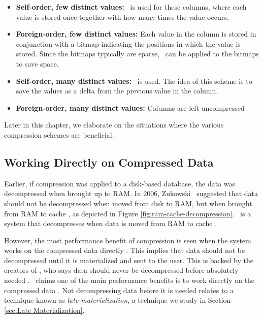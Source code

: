 \begin{itemize}
  \item \textbf{Self-order, few distinct values:} \rle~is used for these columns, where each value is stored once together with how many times the value occurs.
  \item \textbf{Foreign-order, few distinct values:} Each value in the column is stored in conjunction with a bitmap indicating the positions in which the value is stored. Since the bitmaps typically are sparse, \rle~can be applied to the bitmaps to save space.
  \item \textbf{Self-order, many distinct values:} \dele~is used. The idea of this scheme is to save the values as a delta from the previous value in the column.
  \item \textbf{Foreign-order, many distinct values:} Columns are left uncompressed
\end{itemize}

Later in this chapter, we elaborate on the situations where the various compression schemes are beneficial.

\subsection{Working Directly on Compressed Data}
\label{sub:Working Directly on Compressed Data}


Earlier, if compression was applied to a disk-based database, the data was decompressed when brought up to RAM. In 2006, Zukowski \ea~suggested that data should not be decompressed when moved from disk to RAM, but when brought from RAM to cache \cite{Zukowski2006-oz}, as depicted in Figure \ref{fig:ram-cache-decompression}. \monetx~is a system that decompresses when data is moved from RAM to cache \cite{Johnson2008-cp}.

However, the most performance benefit of compression is seen when the system works on the compressed data directly \cite{Lemke2010-is}. This implies that data should not be decompressed until it is materialized and sent to the user. This is backed by the creators of \blink, who says data should never be decompressed before absolutely needed \cite{Barber2012-xt}. \oracle~claims one of the main performance benefits is to work directly on the compressed data \cite{Oracle2015-fs}. Not decompressing data before it is needed relates to a technique known as \textit{late materialization}, a technique we study in Section \ref{sec:Late Materialization}.


